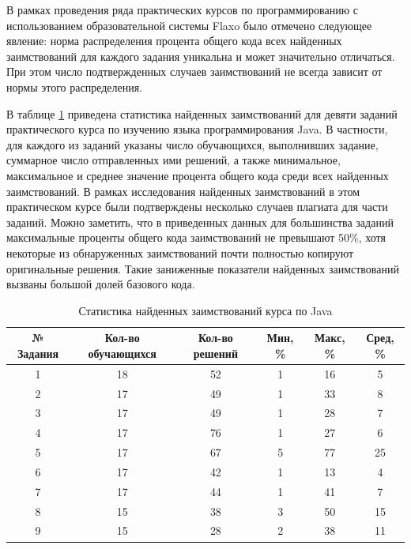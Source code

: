 \documentclass[a4paper,14pt]{extarticle}
\begin{document}
В рамках проведения ряда практических курсов по программированию с использованием образовательной системы Flaxo было отмечено следующее явление: норма распределения процента общего кода всех найденных заимствований для каждого задания уникальна и может значительно отличаться. При этом число подтвержденных случаев заимствований не всегда зависит от нормы этого распределения.

В таблице \ref{tab:javaCourseStats} приведена статистика найденных заимствований для девяти заданий практического курса по изучению языка программирования Java. В частности, для каждого из заданий указаны число обучающихся, выполнивших задание, суммарное число отправленных ими решений, а также минимальное, максимальное и среднее значение процента общего кода среди всех найденных заимствований. В рамках исследования найденных заимствований в этом практическом курсе были подтверждены несколько случаев плагиата для части заданий. Можно заметить, что в приведенных данных для большинства заданий максимальные проценты общего кода заимствований не превышают 50\%, хотя некоторые из обнаруженных заимствований почти полностью копируют оригинальные решения. Такие заниженные показатели найденных заимствований вызваны большой долей базового кода.

\begin{table}[htb]
    \centering
    \begin{tabular}{cccccc}
        \toprule
        № Задания & Кол-во обучающихся & Кол-во решений & Мин, \% & Макс, \% & Сред, \% \\
        \toprule
        1 & 18 & 52 & 1 & 16 & 5 \\
        \midrule
        2 & 17 & 49 & 1 & 33 & 8 \\
        \midrule
        3 & 17 & 49 & 1 & 28 & 7 \\
        \midrule
        4 & 17 & 76 & 1 & 27 & 6 \\
        \midrule
        5 & 17 & 67 & 5 & 77 & 25 \\
        \midrule
        6 & 17 & 42 & 1 & 13 & 4 \\
        \midrule
        7 & 17 & 44 & 1 & 41 & 7 \\
        \midrule
        8 & 15 & 38 & 3 & 50 & 15 \\
        \midrule
        9 & 15 & 28 & 2 & 38 & 11 \\
        \bottomrule
    \end{tabular}
    \caption{Статистика найденных заимствований курса по Java}
    \label{tab:javaCourseStats}
\end{table}
\end{document}
